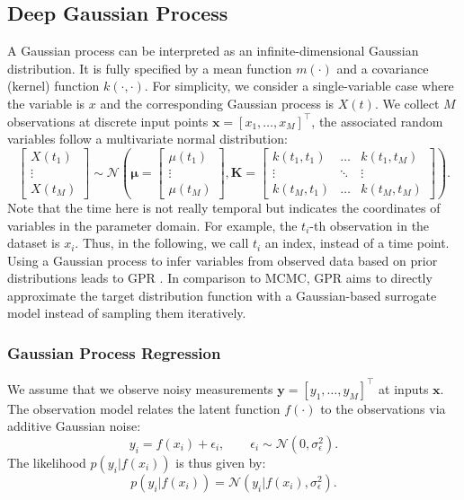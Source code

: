 \subsection{Deep Gaussian Process}
A Gaussian process can be interpreted as an infinite-dimensional Gaussian distribution. It is fully specified by a mean function $m(\cdot)$ and a covariance (kernel) function $k(\cdot, \cdot)$. For simplicity, we consider a single-variable case where the variable is $x$ and the corresponding Gaussian process is $\mathit{X}(t)$. We collect $M$ observations at discrete input points $\boldsymbol{x} = [x_1, \dots, x_M]^\top$, the associated random variables follow a multivariate normal distribution:
\begin{equation}
    \begin{bmatrix} \mathit{X}(t_1) \\ \vdots \\ \mathit{X}(t_M) \end{bmatrix} \sim \mathcal{N} \left( \boldsymbol{\mu}=\begin{bmatrix} \mu(t_1) \\ \vdots \\ \mu(t_M) \end{bmatrix}, \boldsymbol{K}=\begin{bmatrix} k(t_1, t_1) & \dots & k(t_1, t_M) \\ \vdots & \ddots & \vdots \\ k(t_M, t_1) & \dots & k(t_M, t_M) \end{bmatrix} \right).
\end{equation}
Note that the time here is not really temporal but indicates the coordinates of variables in the parameter domain. For example, the $t_i$-th observation in the dataset is $x_i$. Thus, in the following, we call $t_i$ an index, instead of a time point. Using a Gaussian process to infer variables from observed data based on prior distributions leads to \ac{GPR} \citep{Rasmussen_Williams_2008}. In comparison to \ac{MCMC}, \ac{GPR} aims to directly approximate the target distribution function with a Gaussian-based surrogate model instead of sampling them iteratively.

\subsubsection{Gaussian Process Regression}
We assume that we observe noisy measurements $\boldsymbol{y} = [y_1, \dots, y_M]^\top$ at inputs $\boldsymbol{x}$. The observation model relates the latent function $f(\cdot)$ to the observations via additive Gaussian noise:
\begin{equation}\label{eq:simgp}
y_i = f(x_i) + \epsilon_i, \qquad \epsilon_i \sim \mathcal{N}(0,\sigma_\epsilon^2).
\end{equation}
The likelihood $p(y_i|f(x_i))$ is thus given by:
\begin{equation}
    p(y_i|f(x_i))=\mathcal{N}(y_i|f(x_i), \sigma_{\epsilon}^2).
\end{equation}


